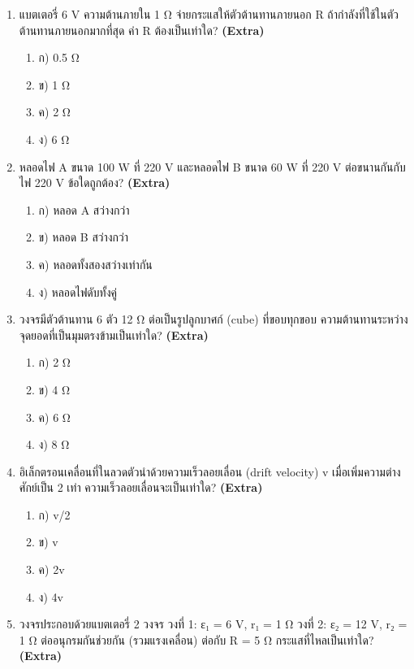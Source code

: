 \documentclass[12pt]{article}
\begin{document}
\begin{enumerate}[label=\arabic*.]
\begin{enumerate}[label=)]
\item ก) 1 Ω
\item ข) 2 Ω
\item ค) 6 Ω
\item ง) 11 Ω
\end{enumerate}
\item แบตเตอรี่ 6 V ความต้านภายใน 1 Ω จ่ายกระแสให้ตัวต้านทานภายนอก R ถ้ากำลังที่ใช้ในตัวต้านทานภายนอกมากที่สุด ค่า R ต้องเป็นเท่าใด? \hfill \textbf{\small (Extra)}
\begin{enumerate}[label=)]
\item ก) 0.5 Ω
\item ข) 1 Ω
\item ค) 2 Ω
\item ง) 6 Ω
\end{enumerate}
\item หลอดไฟ A ขนาด 100 W ที่ 220 V และหลอดไฟ B ขนาด 60 W ที่ 220 V ต่อขนานกันกับไฟ 220 V ข้อใดถูกต้อง? \hfill \textbf{\small (Extra)}
\begin{enumerate}[label=)]
\item ก) หลอด A สว่างกว่า
\item ข) หลอด B สว่างกว่า
\item ค) หลอดทั้งสองสว่างเท่ากัน
\item ง) หลอดไฟดับทั้งคู่
\end{enumerate}
\item วงจรมีตัวต้านทาน 6 ตัว 12 Ω ต่อเป็นรูปลูกบาศก์ (cube) ที่ขอบทุกขอบ ความต้านทานระหว่างจุดยอดที่เป็นมุมตรงข้ามเป็นเท่าใด? \hfill \textbf{\small (Extra)}
\begin{enumerate}[label=)]
\item ก) 2 Ω
\item ข) 4 Ω
\item ค) 6 Ω
\item ง) 8 Ω
\end{enumerate}
\item อิเล็กตรอนเคลื่อนที่ในลวดตัวนำด้วยความเร็วลอยเลื่อน (drift velocity) v เมื่อเพิ่มความต่างศักย์เป็น 2 เท่า ความเร็วลอยเลื่อนจะเป็นเท่าใด? \hfill \textbf{\small (Extra)}
\begin{enumerate}[label=)]
\item ก) v/2
\item ข) v
\item ค) 2v
\item ง) 4v
\end{enumerate}
\item วงจรประกอบด้วยแบตเตอรี่ 2 วงจร วงที่ 1: ε₁ = 6 V, r₁ = 1 Ω วงที่ 2: ε₂ = 12 V, r₂ = 1 Ω ต่ออนุกรมกันช่วยกัน (รวมแรงเคลื่อน) ต่อกับ R = 5 Ω กระแสที่ไหลเป็นเท่าใด? \hfill \textbf{\small (Extra)}

\end{enumerate}
\end{document}
